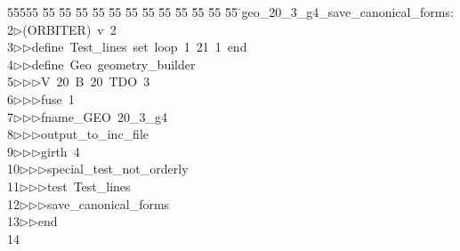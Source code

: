 %
%
\begin{tabbing}
55555 \= 55 \= 55 \= 55 \= 55 \= 55 \= 55 \= 55 \= 55 \= 55 \= 55 \= 55 \= 55 \= \>geo\_20\_3\_g4\_save\_canonical\_forms:\\[0pt]
2\>$\triangleright$\>(ORBITER)\ v\ 2\ \\[0pt]
3\>$\triangleright$\>$\triangleright$\>define\ Test\_lines\ set\ loop\ 1\ 21\ 1\ end\ \\[0pt]
4\>$\triangleright$\>$\triangleright$\>define\ Geo\ geometry\_builder\ \\[0pt]
5\>$\triangleright$\>$\triangleright$\>$\triangleright$\>V\ 20\ B\ 20\ TDO\ 3\ \\[0pt]
6\>$\triangleright$\>$\triangleright$\>$\triangleright$\>fuse\ 1\ \\[0pt]
7\>$\triangleright$\>$\triangleright$\>$\triangleright$\>fname\_GEO\ 20\_3\_g4\ \\[0pt]
8\>$\triangleright$\>$\triangleright$\>$\triangleright$\>output\_to\_inc\_file\ \\[0pt]
9\>$\triangleright$\>$\triangleright$\>$\triangleright$\>girth\ 4\ \\[0pt]
10\>$\triangleright$\>$\triangleright$\>$\triangleright$\>special\_test\_not\_orderly\ \\[0pt]
11\>$\triangleright$\>$\triangleright$\>$\triangleright$\>test\ Test\_lines\ \\[0pt]
12\>$\triangleright$\>$\triangleright$\>$\triangleright$\>save\_canonical\_forms\ \\[0pt]
13\>$\triangleright$\>$\triangleright$\>end\\[0pt]
14\>\end{tabbing}

